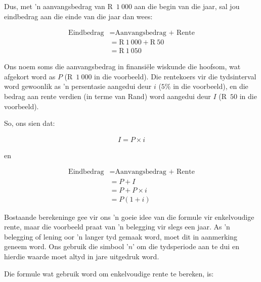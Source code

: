 Dus, met ’n aanvangsbedrag van R~$1~000$ aan die begin van die jaar, sal jou eindbedrag aan die einde van die jaar dan wees:\par 
\begin{align*}
    \mbox{Eindbedrag} &= \mbox{Aanvangsbedrag + Rente}\\
    &= \mbox{R}~1~000 + \mbox{R}~50\\
    &= \mbox{R}~1~050
\end{align*}

Ons noem soms die aanvangsbedrag in finansiële wiskunde die hoofsom, wat afgekort word as $P$ (R~$1~000$ in die voorbeeld). Die rentekoers vir die tydsinterval word gewoonlik as ’n persentasie aangedui deur $i$ ($5\%$ in die voorbeeld),  en die bedrag aan rente verdien (in terme van Rand) word aangedui deur $I$ (R~$50$ in die voorbeeld).\par 

So, ons sien dat:
        
\begin{align*}
    I = P \times i
\end{align*}

en

\begin{align*}
    \mbox{Eindbedrag} &= \mbox{Aanvangsbedrag + Rente} \nonumber\\
    &= P + I \nonumber\\
    &= P + P \times i\nonumber\\
    &= P(1 + i)
\end{align*}



Bostaande berekeninge gee vir ons 'n goeie idee van die formule vir enkelvoudige rente, maar die voorbeeld praat van 'n belegging vir slegs een jaar. As 'n belegging of lening oor 'n langer tyd gemaak word, moet dit in aanmerking geneem word. Ons gebruik die simbool '$n$' om die tydsperiode aan te dui en hierdie waarde moet altyd in jare uitgedruk word.\par

Die formule wat gebruik word om enkelvoudige rente te bereken, is:





